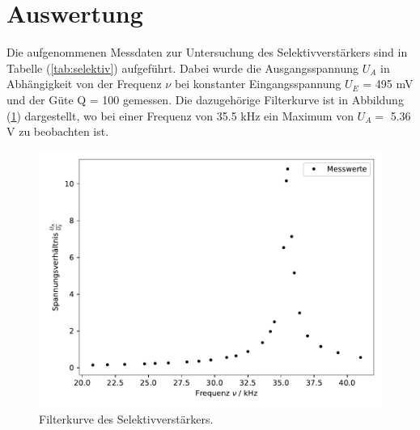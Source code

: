\newpage
\section{Auswertung}
\noindent
Die aufgenommenen Messdaten zur Untersuchung des Selektivverstärkers sind in Tabelle (\ref{tab:selektiv}) aufgeführt.
Dabei wurde die Ausgangsspannung $U_A$ in Abhängigkeit von der Frequenz $\nu$ bei konstanter Eingangsspannung $U_E$ = 495 mV und der Güte Q = 100 gemessen.
Die dazugehörige Filterkurve ist in Abbildung (\ref{fig:selektiv}) dargestellt, 
wo bei einer Frequenz von 35.5 kHz ein Maximum von $U_A =$ 5.36 V
zu beobachten ist.

\begin{figure}
    \centering
       \includegraphics[width=\textwidth]{selektiv.pdf}
       \caption{Filterkurve des Selektivverstärkers.}
       \label{fig:selektiv}
\end{figure}

